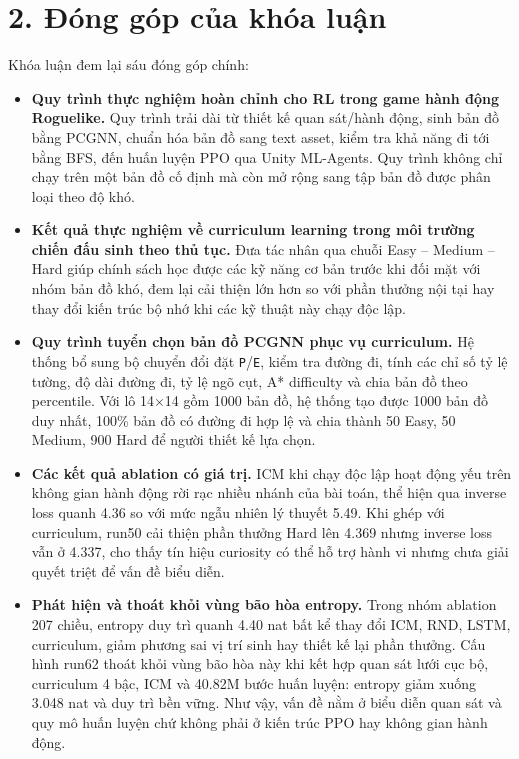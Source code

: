 \section*{2. Đóng góp của khóa luận}

Khóa luận đem lại sáu đóng góp chính:

\begin{itemize}
    \item \textbf{Quy trình thực nghiệm hoàn chỉnh cho RL trong game hành động Roguelike.} Quy trình trải dài từ thiết kế quan sát/hành động, sinh bản đồ bằng PCGNN, chuẩn hóa bản đồ sang text asset, kiểm tra khả năng đi tới bằng BFS, đến huấn luyện PPO qua Unity ML-Agents. Quy trình không chỉ chạy trên một bản đồ cố định mà còn mở rộng sang tập bản đồ được phân loại theo độ khó.

    \item \textbf{Kết quả thực nghiệm về curriculum learning trong môi trường chiến đấu sinh theo thủ tục.} Đưa tác nhân qua chuỗi Easy -- Medium -- Hard giúp chính sách học được các kỹ năng cơ bản trước khi đối mặt với nhóm bản đồ khó, đem lại cải thiện lớn hơn so với phần thưởng nội tại hay thay đổi kiến trúc bộ nhớ khi các kỹ thuật này chạy độc lập.

    \item \textbf{Quy trình tuyển chọn bản đồ PCGNN phục vụ curriculum.} Hệ thống bổ sung bộ chuyển đổi đặt \texttt{P}/\texttt{E}, kiểm tra đường đi, tính các chỉ số tỷ lệ tường, độ dài đường đi, tỷ lệ ngõ cụt, A* difficulty và chia bản đồ theo percentile. Với lô 14$\times$14 gồm 1000 bản đồ, hệ thống tạo được 1000 bản đồ duy nhất, 100\% bản đồ có đường đi hợp lệ và chia thành 50 Easy, 50 Medium, 900 Hard để người thiết kế lựa chọn.

    \item \textbf{Các kết quả ablation có giá trị.} ICM khi chạy độc lập hoạt động yếu trên không gian hành động rời rạc nhiều nhánh của bài toán, thể hiện qua inverse loss quanh 4.36 so với mức ngẫu nhiên lý thuyết 5.49. Khi ghép với curriculum, run50 cải thiện phần thưởng Hard lên 4.369 nhưng inverse loss vẫn ở 4.337, cho thấy tín hiệu curiosity có thể hỗ trợ hành vi nhưng chưa giải quyết triệt để vấn đề biểu diễn.

    \item \textbf{Phát hiện và thoát khỏi vùng bão hòa entropy.} Trong nhóm ablation 207 chiều, entropy duy trì quanh 4.40 nat bất kể thay đổi ICM, RND, LSTM, curriculum, giảm phương sai vị trí sinh hay thiết kế lại phần thưởng. Cấu hình run62 thoát khỏi vùng bão hòa này khi kết hợp quan sát lưới cục bộ, curriculum 4 bậc, ICM và 40.82M bước huấn luyện: entropy giảm xuống 3.048 nat và duy trì bền vững. Như vậy, vấn đề nằm ở biểu diễn quan sát và quy mô huấn luyện chứ không phải ở kiến trúc PPO hay không gian hành động.


\end{itemize}
